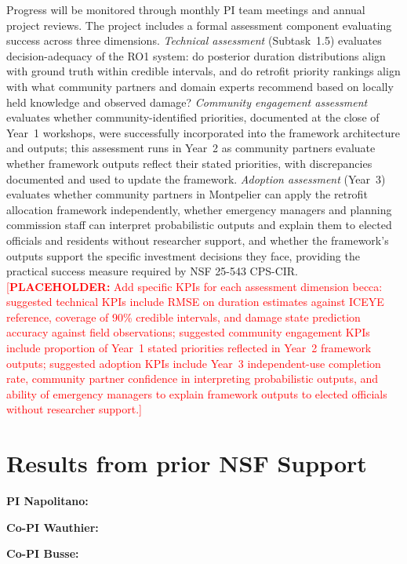 \documentclass[11pt]{article}
\newcommand{\placeholder}[1]{\textcolor{red}{[\textbf{PLACEHOLDER:} #1]}}
\begin{document}
Progress will be monitored through monthly PI team meetings and annual project reviews.
The project includes a formal assessment component evaluating success across three dimensions.
\textit{Technical assessment} (Subtask~1.5) evaluates decision-adequacy of the RO1 system: do posterior duration distributions align with ground truth within credible intervals, and do retrofit priority rankings align with what community partners and domain experts recommend based on locally held knowledge and observed damage?
\textit{Community engagement assessment} evaluates whether community-identified priorities, documented at the close of Year~1 workshops, were successfully incorporated into the framework architecture and outputs; this assessment runs in Year~2 as community partners evaluate whether framework outputs reflect their stated priorities, with discrepancies documented and used to update the framework.
\textit{Adoption assessment} (Year~3) evaluates whether community partners in Montpelier can apply the retrofit allocation framework independently, whether emergency managers and planning commission staff can interpret probabilistic outputs and explain them to elected officials and residents without researcher support, and whether the framework's outputs support the specific investment decisions they face, providing the practical success measure required by NSF 25-543 CPS-CIR.
\placeholder{Add specific KPIs for each assessment dimension becca: suggested technical KPIs include RMSE on duration estimates against ICEYE reference, coverage of 90\% credible intervals, and damage state prediction accuracy against field observations; suggested community engagement KPIs include proportion of Year~1 stated priorities reflected in Year~2 framework outputs; suggested adoption KPIs include Year~3 independent-use completion rate, community partner confidence in interpreting probabilistic outputs, and ability of emergency managers to explain framework outputs to elected officials without researcher support.}


\vspace{-10pt}

\section{Results from prior NSF Support}

\noindent\textbf{PI Napolitano:}

\noindent\textbf{Co-PI Wauthier:}

\noindent\textbf{Co-PI Busse:}

\newpage


\end{document}
